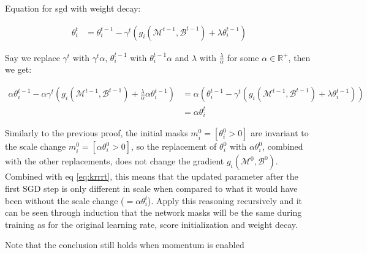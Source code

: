 \documentclass{article}
\begin{document}
    Equation for sgd with weight decay:

    \begin{align}
        \theta_i^t &= \theta_i^{t-1} - \gamma^t \left( g_i(\mathcal{M}^{t-1}, \mathcal{B}^{t-1}) + \lambda \theta_i^{t-1} \right)
    \end{align}

    Say we replace $\gamma^t$ with $\gamma^t \alpha$, $\theta_i^{t-1}$ with $\theta_i^{t-1} \alpha$ and $\lambda$ with $\frac{\lambda}{\alpha}$ for some $\alpha \in \mathbb{R}^+$, then we get:

    \begin{align}
        \alpha\theta_i^{t-1} - \alpha\gamma^t \left( g_i(\mathcal{M}^{t-1}, \mathcal{B}^{t-1}) + \frac{\lambda}{\alpha} \alpha\theta_i^{t-1} \right) &= \alpha \left(\theta_i^{t-1} - \gamma^t \left( g_i(\mathcal{M}^{t-1}, \mathcal{B}^{t-1}) + \lambda \theta_i^{t-1} \right)\right)\\
        &= \alpha\theta_i^{t}\label{eq:krrrt}
    \end{align}

    Similarly to the previous proof, the initial masks $m_i^0 = [\theta_i^0 > 0]$ are invariant to the scale change $m_i^0 = [\alpha\theta_i^0 > 0]$, so the replacement of $\theta_i^0$ with $\alpha\theta_i^0$, combined with the other replacements, does not change the gradient $g_i(\mathcal{M}^0, \mathcal{B}^0)$. Combined with eq \ref{eq:krrrt}, this means that the updated parameter after the first SGD step is only different in scale when compared to what it would have been without the scale change ($=\alpha\theta_i^t$). Apply this reasoning recursively and it can be seen through induction that the network masks will be the same during training as for the original learning rate, score initialization and weight decay.

    Note that the conclusion still holds when momentum is enabled


\end{document}
